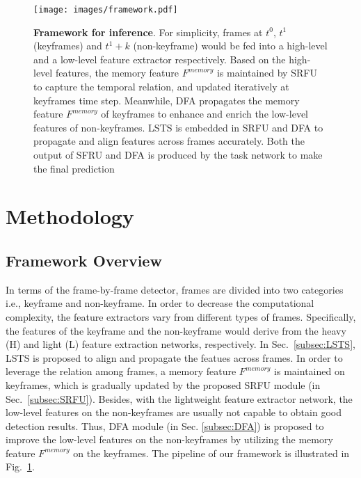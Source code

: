 \documentclass[runningheads]{llncs}
\begin{document}
\begin{figure}[t]
\centering
\texttt{[image: images/framework.pdf]}
\caption{
\textbf{Framework for inference}. 
For simplicity, frames at $t^0$, $t^1$ (keyframes) and $t^1+k$ (non-keyframe) would be fed into a high-level and a low-level feature extractor respectively.
Based on the high-level features, the memory feature $F^{memory}$ is maintained by SRFU to capture the temporal relation, and updated iteratively at keyframes time step.
Meanwhile, DFA propagates the memory feature $F^{memory}$ of keyframes to enhance and enrich the low-level features of non-keyframes. 
LSTS is embedded in SRFU and DFA to propagate and align features across frames accurately. 
Both the output of SFRU and DFA is produced by the task network to make the final prediction
}
\label{framework}
\end{figure}

\section{Methodology}\label{sec:method}
\subsection{Framework Overview}
In terms of the frame-by-frame detector, frames are divided into two categories i.e., keyframe and non-keyframe. 
In order to decrease the computational complexity, the feature extractors vary from different types of frames.
Specifically, the features of the keyframe and the non-keyframe would derive from the heavy (H) and light (L) feature extraction networks, respectively.
In Sec.~\ref{subsec:LSTS}, LSTS is proposed to align and propagate the featues across frames.
In order to leverage the relation among frames, a memory feature $F^{memory}$ is maintained on keyframes, which is gradually updated by the proposed SRFU module (in Sec.~\ref{subsec:SRFU}). 
Besides, with the lightweight feature extractor network, the low-level features on the non-keyframes are usually not capable to obtain good detection results. 
Thus, DFA module (in Sec. \ref{subsec:DFA}) is proposed to improve the low-level features on the non-keyframes by utilizing the memory feature $F^{memory}$ on the keyframes. 
The pipeline of our framework is illustrated in Fig.~\ref{framework}.
\end{document}

